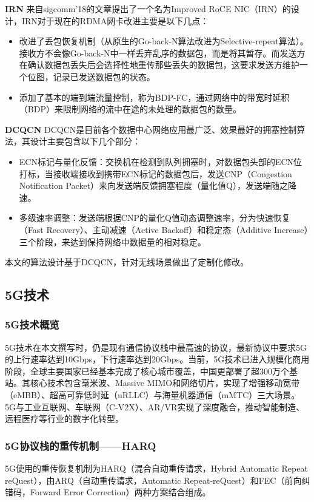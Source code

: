 \documentclass{seuthesis-2022}
\begin{document}
\textbf{IRN}
来自sigcomm'18的文章提出了一个名为Improved RoCE NIC（IRN）的设计，IRN对于现在的RDMA网卡改进主要是以下几点：
\begin{itemize}
    \item 改进了丢包恢复机制（从原生的Go-back-N算法改进为Selective-repeat算法）。接收方不会像Go-back-N中一样丢弃乱序的数据包，而是将其暂存。而发送方在确认数据包丢失后会选择性地重传那些丢失的数据包，这要求发送方维护一个位图，记录已发送数据包的状态。
    \item 添加了基本的端到端流量控制，称为BDP-FC，通过网络中的带宽时延积（BDP）来限制网络的流中在途的未处理的数据包的数量。
\end{itemize}
\textbf{DCQCN}
DCQCN是目前各个数据中心网络应用最广泛、效果最好的拥塞控制算法，其设计主要包含以下几个部分：
\begin{itemize}
    \item ECN标记与量化反馈​​：交换机在检测到队列拥塞时，对数据包头部的ECN位打标，当接收端接收到携带ECN标记的数据包后，发送CNP（Congestion Notification Packet）来向发送端反馈拥塞程度（量化值Q），发送端随之降速。
    \item 多级速率调整​​：发送端根据CNP的量化Q值动态调整速率，分为快速恢复（Fast Recovery）、主动减速（Active Backoff）和稳定态（Additive Increase）三个阶段，来达到保持网络中数据量的相对稳定。
\end{itemize}
本文的算法设计基于DCQCN，针对无线场景做出了定制化修改。
\subsection{5G技术}
\subsubsection{5G技术概览}
5G技术在本文撰写时，仍是现有通信协议栈中最高速的协议，最新协议中要求5G的上行速率达到10Gbps，下行速率达到20Gbps。当前，5G技术已进入规模化商用阶段，全球主要国家已经基本完成了核心城市覆盖，中国更部署了超300万个基站。其核心技术包含毫米波、Massive MIMO和网络切片，实现了增强移动宽带（eMBB）、超高可靠低时延（uRLLC）与海量机器通信（mMTC）三大场景。5G与工业互联网、车联网（C-V2X）、AR/VR实现了深度融合，推动智能制造、远程医疗等行业的数字化转型。
\subsubsection{5G协议栈的重传机制——HARQ}
5G使用的重传恢复机制为HARQ（混合自动重传请求，Hybrid Automatic Repeat reQuest），由ARQ（自动重传请求，Automatic Repeat-reQuest）和FEC（前向纠错码，Forward Error Correction）两种方案结合组成。
\end{document}
